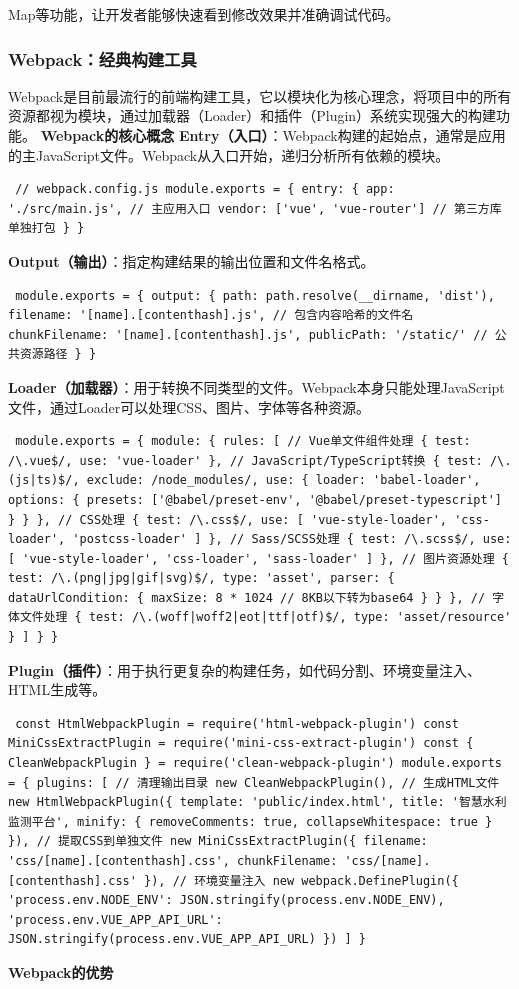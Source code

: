 Map等功能，让开发者能够快速看到修改效果并准确调试代码。 \subsubsection{Webpack：经典构建工具}\label{webpackux7ecfux5178ux6784ux5efaux5de5ux5177} Webpack是目前最流行的前端构建工具，它以模块化为核心理念，将项目中的所有资源都视为模块，通过加载器（Loader）和插件（Plugin）系统实现强大的构建功能。 \textbf{Webpack的核心概念} \textbf{Entry（入口）}：Webpack构建的起始点，通常是应用的主JavaScript文件。Webpack从入口开始，递归分析所有依赖的模块。 \begin{verbatim} // webpack.config.js module.exports = { entry: { app: './src/main.js', // 主应用入口 vendor: ['vue', 'vue-router'] // 第三方库单独打包 } } \end{verbatim} \textbf{Output（输出）}：指定构建结果的输出位置和文件名格式。 \begin{verbatim} module.exports = { output: { path: path.resolve(__dirname, 'dist'), filename: '[name].[contenthash].js', // 包含内容哈希的文件名 chunkFilename: '[name].[contenthash].js', publicPath: '/static/' // 公共资源路径 } } \end{verbatim} \textbf{Loader（加载器）}：用于转换不同类型的文件。Webpack本身只能处理JavaScript文件，通过Loader可以处理CSS、图片、字体等各种资源。 \begin{verbatim} module.exports = { module: { rules: [ // Vue单文件组件处理 { test: /\.vue$/, use: 'vue-loader' }, // JavaScript/TypeScript转换 { test: /\.(js|ts)$/, exclude: /node_modules/, use: { loader: 'babel-loader', options: { presets: ['@babel/preset-env', '@babel/preset-typescript'] } } }, // CSS处理 { test: /\.css$/, use: [ 'vue-style-loader', 'css-loader', 'postcss-loader' ] }, // Sass/SCSS处理 { test: /\.scss$/, use: [ 'vue-style-loader', 'css-loader', 'sass-loader' ] }, // 图片资源处理 { test: /\.(png|jpg|gif|svg)$/, type: 'asset', parser: { dataUrlCondition: { maxSize: 8 * 1024 // 8KB以下转为base64 } } }, // 字体文件处理 { test: /\.(woff|woff2|eot|ttf|otf)$/, type: 'asset/resource' } ] } } \end{verbatim} \textbf{Plugin（插件）}：用于执行更复杂的构建任务，如代码分割、环境变量注入、HTML生成等。 \begin{verbatim} const HtmlWebpackPlugin = require('html-webpack-plugin') const MiniCssExtractPlugin = require('mini-css-extract-plugin') const { CleanWebpackPlugin } = require('clean-webpack-plugin') module.exports = { plugins: [ // 清理输出目录 new CleanWebpackPlugin(), // 生成HTML文件 new HtmlWebpackPlugin({ template: 'public/index.html', title: '智慧水利监测平台', minify: { removeComments: true, collapseWhitespace: true } }), // 提取CSS到单独文件 new MiniCssExtractPlugin({ filename: 'css/[name].[contenthash].css', chunkFilename: 'css/[name].[contenthash].css' }), // 环境变量注入 new webpack.DefinePlugin({ 'process.env.NODE_ENV': JSON.stringify(process.env.NODE_ENV), 'process.env.VUE_APP_API_URL': JSON.stringify(process.env.VUE_APP_API_URL) }) ] } \end{verbatim} \textbf{Webpack的优势} 